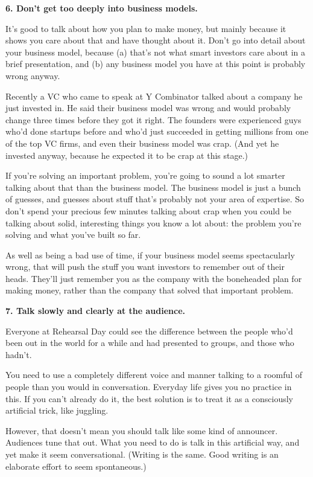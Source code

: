 \textbf{6. Don't get too deeply into business models.}

It's good to talk about how you plan to make money, but mainly because
it shows you care about that and have thought about it. Don't go into
detail about your business model, because (a) that's not what smart
investors care about in a brief presentation, and (b) any business model
you have at this point is probably wrong anyway.

Recently a VC who came to speak at Y Combinator talked about a company
he just invested in. He said their business model was wrong and would
probably change three times before they got it right. The founders were
experienced guys who'd done startups before and who'd just succeeded in
getting millions from one of the top VC firms, and even their business
model was crap. (And yet he invested anyway, because he expected it to
be crap at this stage.)

If you're solving an important problem, you're going to sound a lot
smarter talking about that than the business model. The business model
is just a bunch of guesses, and guesses about stuff that's probably not
your area of expertise. So don't spend your precious few minutes talking
about crap when you could be talking about solid, interesting things you
know a lot about: the problem you're solving and what you've built so
far.

As well as being a bad use of time, if your business model seems
spectacularly wrong, that will push the stuff you want investors to
remember out of their heads. They'll just remember you as the company
with the boneheaded plan for making money, rather than the company that
solved that important problem.

\textbf{7. Talk slowly and clearly at the audience.}

Everyone at Rehearsal Day could see the difference between the people
who'd been out in the world for a while and had presented to groups, and
those who hadn't.

You need to use a completely different voice and manner talking to a
roomful of people than you would in conversation. Everyday life gives
you no practice in this. If you can't already do it, the best solution
is to treat it as a consciously artificial trick, like juggling.

However, that doesn't mean you should talk like some kind of announcer.
Audiences tune that out. What you need to do is talk in this artificial
way, and yet make it seem conversational. (Writing is the same. Good
writing is an elaborate effort to seem spontaneous.)

